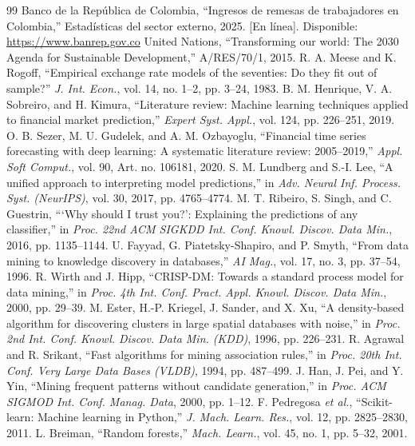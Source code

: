 \documentclass[conference]{IEEEtran}
\begin{document}
\begin{thebibliography}{99}
 Banco de la Rep\'ublica de Colombia, ``Ingresos de remesas de trabajadores en Colombia,'' Estad\'isticas del sector externo, 2025. [En línea]. Disponible: \url{https://www.banrep.gov.co}
 United Nations, ``Transforming our world: The 2030 Agenda for Sustainable Development,'' A/RES/70/1, 2015.
 R. A. Meese and K. Rogoff, ``Empirical exchange rate models of the seventies: Do they fit out of sample?'' \emph{J. Int. Econ.}, vol. 14, no. 1--2, pp. 3--24, 1983.
 B. M. Henrique, V. A. Sobreiro, and H. Kimura, ``Literature review: Machine learning techniques applied to financial market prediction,'' \emph{Expert Syst. Appl.}, vol. 124, pp. 226--251, 2019.
 O. B. Sezer, M. U. Gudelek, and A. M. Ozbayoglu, ``Financial time series forecasting with deep learning: A systematic literature review: 2005--2019,'' \emph{Appl. Soft Comput.}, vol. 90, Art. no. 106181, 2020.
 S. M. Lundberg and S.-I. Lee, ``A unified approach to interpreting model predictions,'' in \emph{Adv. Neural Inf. Process. Syst. (NeurIPS)}, vol. 30, 2017, pp. 4765--4774.
 M. T. Ribeiro, S. Singh, and C. Guestrin, ```Why should I trust you?': Explaining the predictions of any classifier,'' in \emph{Proc. 22nd ACM SIGKDD Int. Conf. Knowl. Discov. Data Min.}, 2016, pp. 1135--1144.
 U. Fayyad, G. Piatetsky-Shapiro, and P. Smyth, ``From data mining to knowledge discovery in databases,'' \emph{AI Mag.}, vol. 17, no. 3, pp. 37--54, 1996.
 R. Wirth and J. Hipp, ``CRISP-DM: Towards a standard process model for data mining,'' in \emph{Proc. 4th Int. Conf. Pract. Appl. Knowl. Discov. Data Min.}, 2000, pp. 29--39.
 M. Ester, H.-P. Kriegel, J. Sander, and X. Xu, ``A density-based algorithm for discovering clusters in large spatial databases with noise,'' in \emph{Proc. 2nd Int. Conf. Knowl. Discov. Data Min. (KDD)}, 1996, pp. 226--231.
 R. Agrawal and R. Srikant, ``Fast algorithms for mining association rules,'' in \emph{Proc. 20th Int. Conf. Very Large Data Bases (VLDB)}, 1994, pp. 487--499.
 J. Han, J. Pei, and Y. Yin, ``Mining frequent patterns without candidate generation,'' in \emph{Proc. ACM SIGMOD Int. Conf. Manag. Data}, 2000, pp. 1--12.
 F. Pedregosa \emph{et al.}, ``Scikit-learn: Machine learning in Python,'' \emph{J. Mach. Learn. Res.}, vol. 12, pp. 2825--2830, 2011.
 L. Breiman, ``Random forests,'' \emph{Mach. Learn.}, vol. 45, no. 1, pp. 5--32, 2001.

\end{thebibliography}
\end{document}
